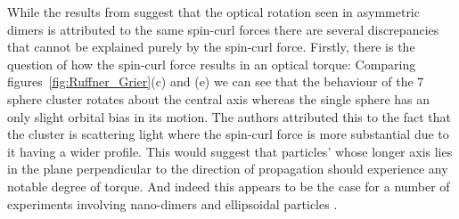 While the results from \cite{Ruffner2012} suggest that the optical rotation 
seen in asymmetric dimers is attributed to the same spin-curl forces there 
are several discrepancies that cannot be explained purely by the spin-curl 
force. Firstly, there is the question of how the spin-curl force results in
an optical torque: Comparing figures~\ref{fig:Ruffner_Grier}(c) and (e) we 
can see that the behaviour of the 7 sphere cluster rotates about the central 
axis whereas the single sphere has an only slight orbital bias in its motion. 
The authors attributed this to the fact that the cluster is scattering light 
where the spin-curl force is more substantial due to it having a wider profile. 
This would suggest that particles' whose longer axis lies in the plane perpendicular to the direction of propagation should experience any notable degree of torque. And indeed this appears to be the case for a number of experiments involving nano-dimers and ellipsoidal particles \cite{Ahn2018, Reimann2018}.

